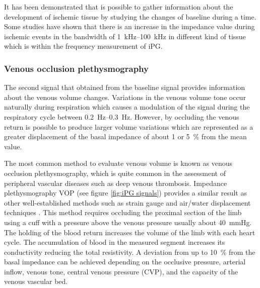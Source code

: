 It has been demonstrated that is possible to gather information about the development of ischemic tissue by studying the changes of baseline during a time. Some studies have shown that there is an increase in the impedance value during ischemic events in the bandwidth of \SIrange{1}{100}{\kilo\hertz} in different kind of tissue \cite{songer2001tissue,casas1999vivo,kun1994tissue,ristic1997muscle} which is within the frequency measurement of iPG. 

\subsubsection{Venous occlusion plethysmography}
The second signal that obtained from the baseline signal provides information about the venous volume changes. Variations in the venous volume tone occur naturally during respiration which causes a modulation of the signal during the respiratory cycle between \SIrange{0.2}{0.3}{\hertz}. However, by occluding the venous return is possible to produce larger volume variations which are represented as a greater displacement of the basal impedance of about \SI{1}{\Omega} or \SI{5}{\percent} from the mean value. 

The most common method to evaluate venous volume is known as venous occlusion plethysmography, which is quite common in the assessment of peripheral vascular diseases such as deep venous thrombosis. Impedance plethysmography VOP (see figure \ref{fig:iPG signals}) provides a similar result as other well-established methods such as strain gauge\cite{schraibman1975comparison} and air/water displacement techniques \cite{fleming1986comparison}. This method requires occluding the proximal section of the limb using a cuff with a pressure above the venous pressure usually about \SI{40}{\mmHg}.  The holding of the blood return increases the volume of the limb with each heart cycle. The accumulation of blood in the measured segment increases its conductivity reducing the total resistivity.  A deviation from up to \SI{10}{\percent} from the basal impedance can be achieved depending on the occlusive pressure, arterial inflow, venous tone, central venous pressure (CVP), and the capacity of the venous vascular bed. 

